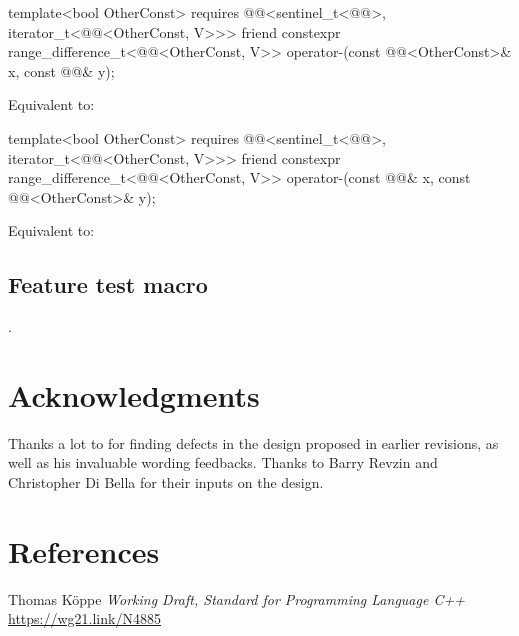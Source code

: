 \documentclass{wg21}
\begin{document}
\begin{addedblock}
%
\begin{itemdecl}
	template<bool OtherConst>
	requires @@<sentinel_t<@@>, iterator_t<@@<OtherConst, V>>>
	friend constexpr range_difference_t<@@<OtherConst, V>>
	operator-(const @@<OtherConst>& x, const @@& y);
\end{itemdecl}

\begin{itemdescr}
	\pnum
	\effects
	Equivalent to: 
\end{itemdescr}

%
\begin{itemdecl}
	template<bool OtherConst>
	requires @@<sentinel_t<@@>, iterator_t<@@<OtherConst, V>>>
	friend constexpr range_difference_t<@@<OtherConst, V>>
	operator-(const @@& x, const @@<OtherConst>& y);
\end{itemdecl}

\begin{itemdescr}
	\pnum
	\effects
	Equivalent to: 
\end{itemdescr}

\subsection{Feature test macro}

.

\end{addedblock}


\section{Acknowledgments}

Thanks a lot to  for finding defects in the design proposed in earlier revisions, as well as his invaluable wording feedbacks.
Thanks to Barry Revzin and Christopher Di Bella for their inputs on the design.

\section{References}
\renewcommand{\section}[2]{}%



\begin{thebibliography}{9}

Thomas Köppe
\emph{Working Draft, Standard for Programming Language C++}\newline
\url{https://wg21.link/N4885}


\end{thebibliography}
\end{document}
